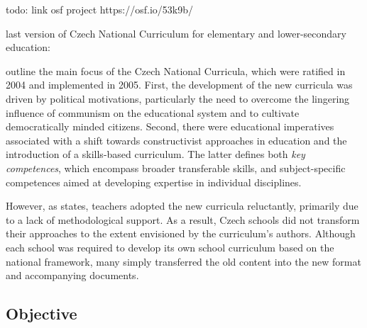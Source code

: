 \documentclass[]{interact}
\theoremstyle{plain}%
\theoremstyle{definition}
\theoremstyle{remark}
\begin{document}
todo: link osf project https://osf.io/53k9b/
\cite{Braun2006Using}


last version of Czech National Curriculum for elementary and lower-secondary education: \cite{RVPZV2023}



\cite{Gracova2015Problems} outline the main focus of the Czech National Curricula, which were ratified in 2004 and implemented in 2005. First, the development of the new curricula was driven by political motivations, particularly the need to overcome the lingering influence of communism on the educational system and to cultivate democratically minded citizens. Second, there were educational imperatives associated with a shift towards constructivist approaches in education and the introduction of a skills-based curriculum. The latter defines both \textit{key competences}, which encompass broader transferable skills, and subject-specific competences aimed at developing expertise in individual disciplines.

However, as \cite{Jirecek2023Promeny} states, teachers adopted the new curricula reluctantly, primarily due to a lack of methodological support. As a result, Czech schools did not transform their approaches to the extent envisioned by the curriculum's authors. Although each school was required to develop its own school curriculum based on the national framework, many simply transferred the old content into the new format and accompanying documents.







\subsection{Objective}
\end{document}
